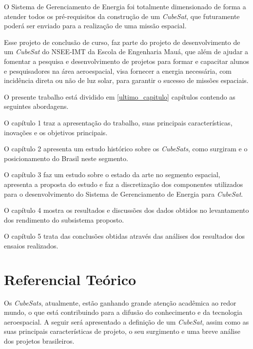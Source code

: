 \documentclass[
	12pt,				%
	openright,			%
	oneside,			%
	a4paper,			%
	english,			%
	french,				%
	spanish,			%
	brazil,				%
	oldfontcommands
	]{abntex2}
\begin{document}
	O Sistema de Gerenciamento de Energia foi totalmente dimensionado de forma a atender todos os pré-requisitos da construção de um \textit{CubeSat}, que futuramente poderá ser enviado para a realização de uma missão espacial.


	Esse projeto de conclusão de curso, faz parte do projeto de desenvolvimento de um \textit{CubeSat} do NSEE-IMT da Escola de Engenharia Mauá, que além de ajudar a fomentar a pesquisa e desenvolvimento de projetos para formar e capacitar alunos e pesquisadores na área aeroespacial, visa fornecer a energia necessária, com incidência direta ou não de luz solar, para garantir o sucesso de missões espaciais.
	
	O presente trabalho está dividido em \ref{ultimo_capitulo} capítulos contendo as seguintes abordagens.

	O capítulo 1 traz a apresentação do trabalho, suas principais características, inovações e os objetivos principais.

	O capítulo 2 apresenta um estudo histórico sobre os \textit{CubeSats}, como surgiram e o posicionamento do Brasil neste segmento. 

	O capítulo 3 faz um estudo sobre o estado da arte no segmento espacial, apresenta a proposta do estudo e faz a discretização dos componentes utilizados para o desenvolvimento do Sistema de Gerenciamento de Energia para \textit{CubeSat}.

	O capítulo 4 mostra os resultados e discussões dos dados obtidos no levantamento dos rendimento do subsistema proposto.

	O capítulo 5 trata das conclusões obtidas através das análises dos resultados dos ensaios realizados. 

\chapter[Referencial Teórico]{Referencial Teórico}

	Os \textit{CubeSats}, atualmente, estão ganhando grande atenção acadêmica ao redor mundo, o que está contribuindo para a difusão do conhecimento e da tecnologia aeroespacial. A seguir será apresentado a definição de um \textit{CubeSat}, assim como as suas principais características de projeto, o seu surgimento e uma breve análise dos projetos brasileiros. 
\end{document}
